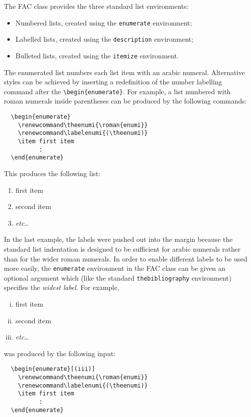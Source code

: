 \documentclass{fac}
\newcommand\etc{\textit{etc}}
\begin{document}
The FAC class provides the three standard list environments:
\begin{itemize}
  \item Numbered lists, created using the \verb"enumerate" environment;
  \item Labelled lists, created using the \verb"description" environment;
  \item Bulleted lists, created using the \verb"itemize" environment.
\end{itemize}
The enumerated list numbers each list item with an arabic numeral.
Alternative styles can be achieved by inserting a redefinition of the
number labelling command after the \verb"\begin{enumerate}".
For example, a list numbered with roman numerals inside parentheses can be
produced by the following commands:
%
\begin{verbatim}
  \begin{enumerate}
    \renewcommand\theenumi{\roman{enumi}}
    \renewcommand\labelenumi{(\theenumi)}
    \item first item
          :
  \end{enumerate}
\end{verbatim}
%
This produces the following list:
%
\begin{enumerate}
  \renewcommand\theenumi{\roman{enumi}}
  \renewcommand\labelenumi{(\theenumi)}
  \item first item
  \item second item
  \item \etc\ldots
\end{enumerate}
%
In the last example, the labels were pushed out into the margin  because
the standard list indentation is designed to be sufficient for arabic
numerals rather than for the wider roman numerals. In order to enable
different labels to be used more easily, the \verb"enumerate" environment
in the FAC class can be given an optional argument which (like the standard
\verb"thebibliography" environment) specifies the \emph{widest label}. For
example,
%
\begin{enumerate}[(iii)]
  \renewcommand\theenumi{\roman{enumi}}
  \renewcommand\labelenumi{(\theenumi)}
  \item first item
  \item second item
  \item \etc\ldots
\end{enumerate}
%
was produced by the following input:
%
\begin{verbatim}
  \begin{enumerate}[(iii)]
    \renewcommand\theenumi{\roman{enumi}}
    \renewcommand\labelenumi{(\theenumi)}
    \item first item
          :
  \end{enumerate}
\end{verbatim}
\end{document}
